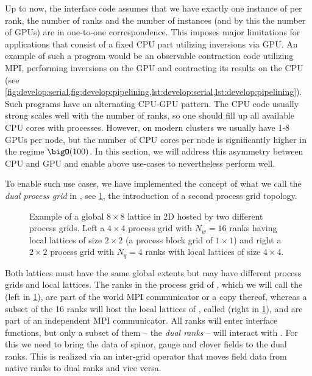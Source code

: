 
Up to now, the interface code assumes that we have exactly one instance of \quda per rank, \ie the number of ranks and the number of \quda instances (and by this the number of GPUs) are in one-to-one correspondence.
This imposes major limitations for applications that consist of a fixed CPU part utilizing inversions via GPU.
An example of such a program would be an observable contraction code utilizing MPI, performing inversions on the GPU and contracting its results on the CPU (see \cref{fig:develop:serial,fig:develop:pipelining,lst:develop:serial,lst:develop:pipelining}).
Such programs have an alternating CPU-GPU pattern.
The CPU code usually strong scales well with the number of ranks, so one should fill up all available CPU cores with processes.
However, on modern clusters we usually have 1-8 GPUs per node, but the number of CPU cores per node is significantly higher in the regime $\bigO(100)$.
In this section, we will address this asymmetry between CPU and GPU and enable above use-cases to nevertheless perform well.

To enable such use cases, we have implemented the concept of what we call the \emph{dual process grid} in \openqxd, see \cref{fig:interface:dual_naive}, \ie the introduction of a second process grid topology.
\begin{figure}
  
  \caption{Example of a global $8 \times 8$ lattice in 2D hosted by two different process grids. Left a $4 \times 4$ process grid with $N_w = 16$ ranks having local lattices of size $2 \times 2$ (a process block grid of $1 \times 1$) and right a $2 \times 2$ process grid with $N_q = 4$ ranks with local lattices of size $4 \times 4$.}
  \label{fig:interface:dual_naive}
\end{figure}
Both lattices must have the same global extents but may have different process grids and local lattices.
The ranks in the process grid of \openqxd, which we will call the  (left in \cref{fig:interface:dual_naive}), are part of the world MPI communicator  or a copy thereof, whereas a subset of the \num{16} ranks will host the local lattices of \quda, called  (right in \cref{fig:interface:dual_naive}), and are part of an independent MPI communicator.
All ranks will enter interface functions, but only a subset of them -- the \emph{dual ranks} -- will interact with \quda.
For this we need to bring the data of spinor, gauge and clover fields to the dual ranks.
This is realized via an inter-grid operator that moves field data from native ranks to dual ranks and vice versa.

